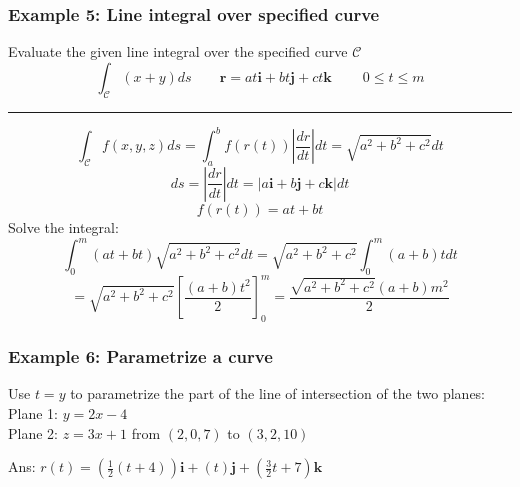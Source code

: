 \subsubsection{Example 5: Line integral over specified curve}
Evaluate the given line integral over the specified curve $\mathcal{C}$
$$\textstyle\int_{\mathcal{C}}(x+y)ds\qquad \mathbf{r}=a t\mathbf{i}+b t\mathbf{j}+c t\mathbf{k}\qquad\ 0\leq t\leq m$$

\rule{\textwidth}{0.5pt}

$$\int_{\mathcal{C}}f(x,y,z)ds=\int_a^bf(r(t))\left|\frac{dr}{dt}\right|dt=\sqrt{a^2+b^2+c^2}dt$$
$$ds=\left|\frac{dr}{dt}\right|dt=|a\mathbf{i}+b\mathbf{j}+c\mathbf{k}|dt$$
$$f(r(t))=at+bt$$
Solve the integral:
$$\int_0^m(at+bt)\sqrt{a^2+b^2+c^2}dt=\sqrt{a^2+b^2+c^2}\int_0^m(a+b)tdt$$
$$=\sqrt{a^2+b^2+c^2}\left[\frac{(a+b)t^2}{2}\right]_0^m=\frac{\sqrt{a^2+b^2+c^2}(a+b)m^2}{2}$$
\subsubsection{Example 6: Parametrize a curve}
Use $t=y$ to parametrize the part of the line of intersection of the two planes:\\
Plane 1: $y=2x-4$\\
Plane 2: $z=3x+1$ from $(2,0,7)$ to $(3,2,10)$

Ans: $r(t)=\left(\frac{1}{2}(t+4)\right)\mathbf{i}+(t)\mathbf{j}+\left(\frac{3}{2}t+7\right)\mathbf{k}$
